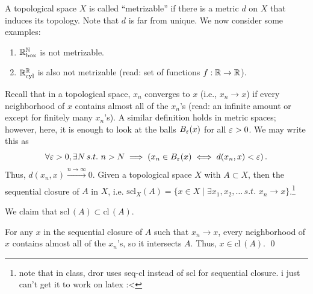 \newpage
\noindent A topological space $X$ is called ``metrizable'' if there is a metric $d$ on $X$ that induces its topology. Note that $d$ is far from unique. We now consider some examples:
\begin{enumerate}[label=(\alph*)]
    \item $\mathbb R^\mathbb N_\mathrm{box}$ is not metrizable.
    \item $\mathbb R^\mathbb R_\mathrm{cyl}$ is also not metrizable (read: set of functions $f : \mathbb R \to \mathbb R$).
\end{enumerate}
Recall that in a topological space, $x_n$ converges to $x$ (i.e., $x_n \to x$) if every neighborhood of $x$ contains almost all of the $x_n$'s (read: an infinite amount or except for finitely many $x_n$'s). A similar definition holds in metric spaces; however, here, it is enough to look at the balls $B_\varepsilon(x)$ for all $\varepsilon > 0$. We may write this as
\[ \forall \varepsilon > 0, \exists N \, s.t. \,\, n > N \implies \left(x_n \in B_\varepsilon(x) \iff d(x_n, x) < \varepsilon\right). \]
Thus, $d(x_n, x) \xrightarrow[]{n \to \infty} 0$.
\medskip\newline
Given a topological space $X$ with $A \subset X$, then the sequential closure of $A$ in $X$, i.e. $\mathrm{scl}_X(A) = \{x \in X \mid \exists x_1, x_2, \dots \, s.t. \,\, x_n \to x\}$.\footnote{note that in class, dror uses seq-cl instead of scl for sequential closure. i just can't get it to work on latex :<}

\begin{simpleclaim}
    We claim that $\mathrm{scl}\,(A) \subset \mathrm{cl}\,(A)$.
\end{simpleclaim}
\noindent For any $x$ in the sequential closure of $A$ such that $x_n \to x$, every neighborhood of $x$ contains almost all of the $x_n$'s, so it intersects $A$. Thus, $x \in \mathrm{cl}\,(A)$. \qed

